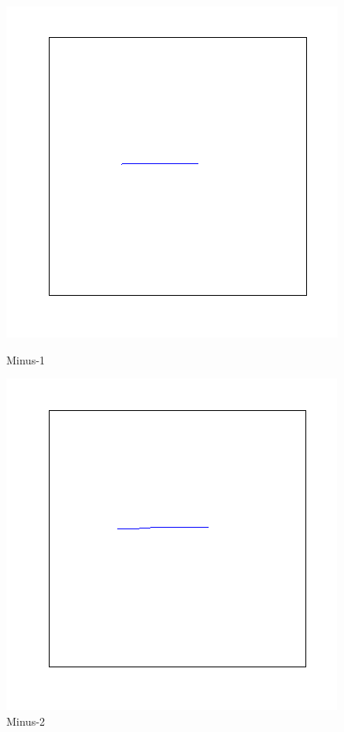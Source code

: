 \documentclass[a4paper, 10pt]{article}
\begin{document}
\begin{figure}[ht]
\begin{minipage}[b]{0.45\linewidth}
\centering
\includegraphics[width=\textwidth]{figs/--1}
\caption{Minus-1}
\label{fig:figure1}
\end{minipage}
\hspace{0.5cm}
\begin{minipage}[b]{0.45\linewidth}
\centering
\includegraphics[width=\textwidth]{figs/--2}
\caption{Minus-2}
\label{fig:figure2}
\end{minipage}
\end{figure}
\end{document}

